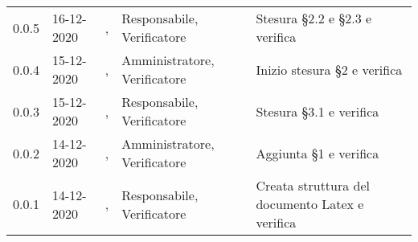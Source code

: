 {{\begin{longtable}{C{1.7cm} | C{2.2cm} | C{3.2cm} | C{3cm} | C{4.8cm}}
0.0.5 & 16-12-2020 & \BM{}, \SH{} & Responsabile, Verificatore & Stesura \S 2.2 e \S 2.3 e verifica \\
		
0.0.4 & 15-12-2020 & \PA{}, \SH{} & Amministratore, Verificatore & Inizio stesura \S 2 e verifica \\

0.0.3 & 15-12-2020 & \SG{}, \ZM{} & Responsabile, Verificatore & Stesura \S 3.1 e verifica \\

0.0.2 & 14-12-2020 & \PA{}, \ZM{} & Amministratore, Verificatore & Aggiunta \S 1 e verifica \\

0.0.1 & 14-12-2020 & \SG{}, \ZM{} & Responsabile, Verificatore & Creata struttura del documento Latex e verifica \\
		
\end{longtable}
}
}
